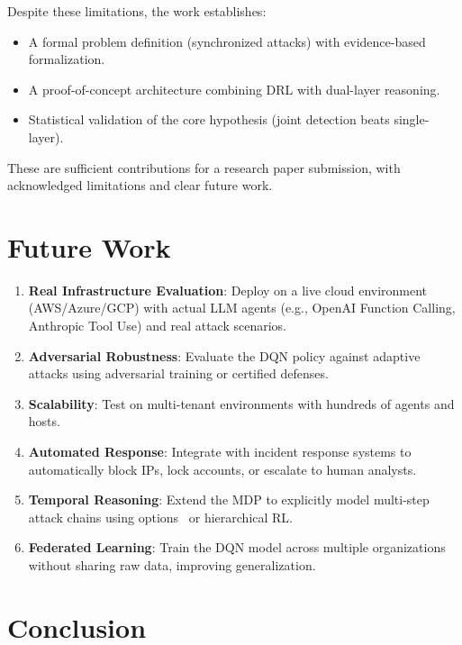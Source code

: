 \documentclass[conference]{IEEEtran}
\begin{document}
Despite these limitations, the work establishes:
\begin{itemize}
\item A formal problem definition (synchronized attacks) with evidence-based formalization.
\item A proof-of-concept architecture combining DRL with dual-layer reasoning.
\item Statistical validation of the core hypothesis (joint detection beats single-layer).
\end{itemize}

These are sufficient contributions for a research paper submission, with acknowledged limitations and clear future work.

\section{Future Work}

\begin{enumerate}
\item \textbf{Real Infrastructure Evaluation}: Deploy on a live cloud environment (AWS/Azure/GCP) with actual LLM agents (e.g., OpenAI Function Calling, Anthropic Tool Use) and real attack scenarios.
\item \textbf{Adversarial Robustness}: Evaluate the DQN policy against adaptive attacks using adversarial training or certified defenses.
\item \textbf{Scalability}: Test on multi-tenant environments with hundreds of agents and hosts.
\item \textbf{Automated Response}: Integrate with incident response systems to automatically block IPs, lock accounts, or escalate to human analysts.
\item \textbf{Temporal Reasoning}: Extend the MDP to explicitly model multi-step attack chains using options~\cite{precup1998options} or hierarchical RL.
\item \textbf{Federated Learning}: Train the DQN model across multiple organizations without sharing raw data, improving generalization.
\end{enumerate}

\section{Conclusion}\label{sec:conclusion}
\end{document}

